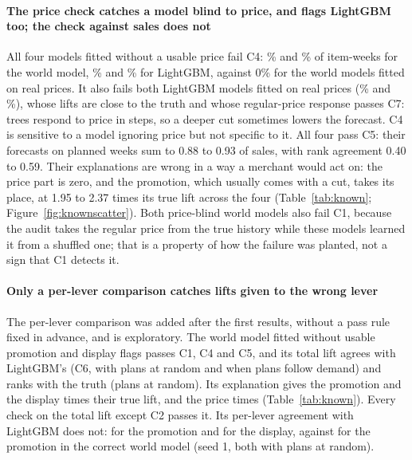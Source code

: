 \paragraph{The price check catches a model blind to price, and flags LightGBM
too; the check against sales does not}
All four models fitted without a usable price fail C4: \kaClWmNpCfour\% and
\kaCoWmNpCfour\% of item-weeks for the world model, \kaClLgbNpCfour\% and
\kaCoLgbNpCfour\% for LightGBM, against 0\% for the world models fitted on real prices. It also fails both
LightGBM models fitted on real prices (\kaClLgbCfour\% and \kaCoLgbCfour\%),
whose lifts are close to the truth and whose regular-price response passes C7:
trees respond to price in steps, so a deeper cut sometimes lowers the forecast.
C4 is sensitive to a model ignoring price but not specific to it. All four pass C5: their forecasts on planned weeks sum to 0.88 to 0.93
of sales, with rank agreement 0.40 to 0.59. Their explanations are wrong in a
way a merchant would act on: the price part is zero, and the promotion, which
usually comes with a cut, takes its place, at 1.95 to 2.37 times its true lift
across the four (Table~\ref{tab:known}; Figure~\ref{fig:knownscatter}).
Both price-blind world models also fail C1, because the audit takes the
regular price from the true history while these models learned it from a
shuffled one; that is a property of how the failure was planted, not a sign
that C1 detects it.

\paragraph{Only a per-lever comparison catches lifts given to the wrong lever}
The per-lever comparison was added after the first results, without a pass rule
fixed in advance, and is exploratory.
The world model fitted without usable promotion and display flags passes C1,
C4 and C5, and its total lift agrees with LightGBM's (C6, \kaClNlCsix{} with
plans at random and \kaCoNlCsix{} when plans follow demand) and ranks
\kaClWmNlTruth{} with the truth (plans at random). Its explanation gives
the promotion \kaClWmNlPromoBias{} and the display \kaClWmNlDisplayBias{} times
their true lift, and the price \kaClWmNlPriceBias{} times
(Table~\ref{tab:known}). Every check on the total lift except C2 passes it.
Its per-lever agreement with LightGBM does not: \kaClNlCsixPromo{} for the
promotion and \kaClNlCsixDisplay{} for the display, against
\kaClWmCsixPromo{} for the promotion in the correct world model (seed 1, both
with plans at random).

